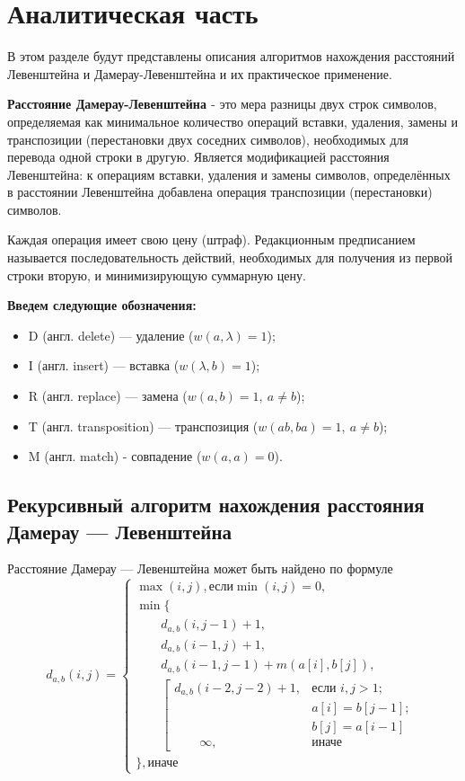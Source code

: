 \chapter{Аналитическая часть}
В этом разделе будут представлены описания алгоритмов нахождения расстояний Левенштейна и Дамерау-Левенштейна и их практическое применение.

\textbf{Расстояние Дамерау-Левенштейна \cite{Dameray_Levenshtein}} - это мера разницы двух строк символов, определяемая как минимальное количество операций вставки, удаления, замены и транспозиции (перестановки двух соседних символов), необходимых для перевода одной строки в другую. Является модификацией расстояния Левенштейна: к операциям вставки, удаления и замены символов, определённых в расстоянии Левенштейна добавлена операция транспозиции (перестановки) символов.

Каждая операция имеет свою цену (штраф). Редакционным предписанием называется последовательность действий, необходимых для получения из первой строки вторую, и минимизирующую суммарную цену.

\textbf{Введем следующие обозначения:} 
\begin{itemize}
	\item D (англ. delete) — удаление ($w(a,\lambda)=1$);
	\item I (англ. insert) — вставка ($w(\lambda,b)=1$);
	\item R (англ. replace) — замена  ($w(a,b)=1, \medspace a \neq b$);
	\item T (англ. transposition) — транспозиция ($w(ab,ba)=1, \medspace a \neq b$);
	\item M (англ. match) - совпадение ($w(a,a)=0$).
\end{itemize}

\section{Рекурсивный алгоритм нахождения расстояния Дамерау — Левенштейна}

Расстояние Дамерау — Левенштейна может быть найдено по формуле
\begin{equation}
	\label{eq:1.1}
	d_{a,b}(i, j) = \begin{cases}
		\max(i, j), \text{если}\min(i, j) = 0,\\
		\min \lbrace \\
		\qquad d_{a,b}(i, j-1) + 1,\\
		\qquad d_{a,b}(i-1, j) + 1,\\
		\qquad d_{a,b}(i-1, j-1) + m(a[i], b[j]),\\
		\qquad \left[ \begin{array}{cc}d_{a,b}(i-2, j-2) + 1, &\text{если }i,j > 1;\\
			\qquad &\text{}a[i] = b[j-1]; \\
			\qquad &\text{}b[j] = a[i-1]\\
			\qquad \infty, & \text{иначе}\end{array}\right.\\
		\rbrace, \text{иначе}
	\end{cases}
\end{equation}

